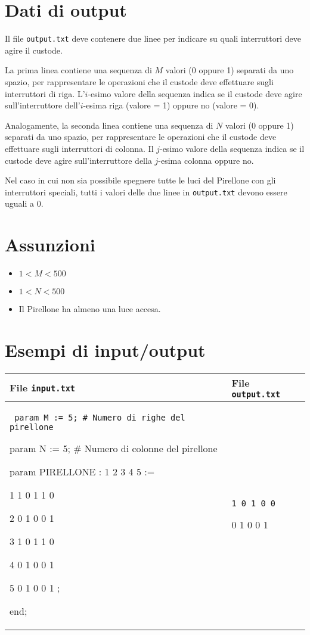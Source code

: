 \documentclass[a4paper,11pt]{article}
\newcommand{\file}[1]{\texttt{#1}}
\newcommand{\esempio}[2]{
\noindent\begin{minipage}{\textwidth}
\begin{tabular}{|p{11cm}|p{5cm}|}
	\hline
	\textbf{File \file{input.txt}} & \textbf{File \file{output.txt}}\\
	\hline
	\tt \small #1 &
	\tt \small #2 \\
	\hline
\end{tabular}
\end{minipage}
}
\begin{document}
\section*{Dati di output}
  
Il file \texttt{output.txt} deve contenere due linee per indicare
su quali interruttori deve agire il custode.

La prima linea contiene una sequenza di $M$ valori (0 oppure
1) separati da uno spazio, per rappresentare le operazioni che il
custode deve effettuare sugli interruttori di riga.
L'$i$-esimo valore della sequenza indica se il custode deve
agire sull'interruttore dell'$i$-esima riga (valore = 1)
oppure no (valore = 0).

Analogamente, la seconda linea contiene una sequenza di $N$
valori (0 oppure 1) separati da uno spazio, per rappresentare le
operazioni che il custode deve effettuare sugli interruttori di
colonna.  Il $j$-esimo valore della sequenza indica se il
custode deve agire sull'interruttore della $j$-esima colonna
oppure no.

Nel caso in cui non sia possibile spegnere tutte le luci del Pirellone
con gli interruttori speciali, tutti i valori delle due linee in
\texttt{output.txt} devono essere uguali a 0.

  \section*{Assunzioni}
  \begin{itemize}
  
    \item $ 1 < M < 500$
    \item $ 1 < N < 500$
    \item  Il Pirellone ha almeno una luce accesa.
  \end{itemize}

\section*{Esempi di input/output}

\esempio{
param M := 5;  \# Numero di righe del pirellone

param N := 5;  \# Numero di colonne del pirellone

param PIRELLONE :  1 2 3 4 5 :=

              1    1 0 1 1 0

              2    0 1 0 0 1

              3    1 0 1 1 0 

              4    0 1 0 0 1

              5    0 1 0 0 1 ;

end;}{1 0 1 0 0

0 1 0 0 1}
\end{document}

